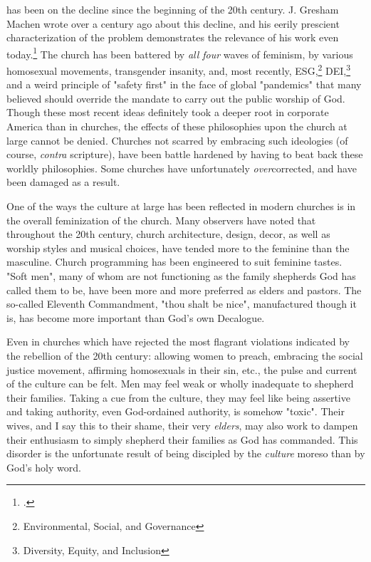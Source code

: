  has been on the decline since the beginning of the 20th century.  J. Gresham Machen wrote over a century ago about this decline, and his eerily prescient characterization of the problem demonstrates the relevance of his work even today.\footcite{machenchristianity}  The church has been battered by \textit{all four} waves of feminism, by various homosexual movements, transgender insanity, and, most recently, ESG,\footnote{Environmental, Social, and Governance} DEI,\footnote{Diversity, Equity, and Inclusion} and a weird principle of "safety first" in the face of global "pandemics" that many believed should override the mandate to carry out the public worship of God.  Though these most recent ideas definitely took a deeper root in corporate America than in churches, the effects of these philosophies upon the church at large cannot be denied.  Churches not scarred by embracing such ideologies (of course, \textit{contra} scripture), have been battle hardened by having to beat back these worldly philosophies.  Some churches have unfortunately \textit{over}corrected, and have been damaged as a result.

One of the ways the culture at large has been reflected in modern churches is in the overall feminization of the church.  Many observers have noted that throughout the 20th century, church architecture, design, decor, as well as worship styles and musical choices, have tended more to the feminine than the masculine.  Church programming has been engineered to suit feminine tastes.  "Soft men", many of whom are not functioning as the family shepherds God has called them to be, have been more and more preferred as elders and pastors.  The so-called Eleventh Commandment, "thou shalt be nice", manufactured though it is, has become more important than God's own Decalogue.  

Even in churches which have rejected the most flagrant violations indicated by the rebellion of the 20th century: allowing women to preach, embracing the social justice movement, affirming homosexuals in their sin, etc., the pulse and current of the culture can be felt.  Men may feel weak or wholly inadequate to shepherd their families.  Taking a cue from the culture, they may feel like being assertive and taking authority, even God-ordained authority, is somehow "toxic".  Their wives, and I say this to their shame, their very \textit{elders}, may also work to dampen their enthusiasm to simply shepherd their families as God has commanded.  This disorder is the unfortunate result of being discipled by the \textit{culture} moreso than by God's holy word.  

